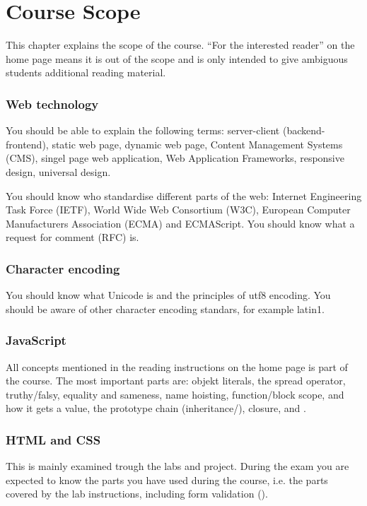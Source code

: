 
\chapter{Course Scope} \label{chapter:course}
This chapter explains the scope of the course. ``For the interested reader'' on the home page means it is out of the scope and is only intended to give ambiguous students additional reading material.

\subsection*{Web technology}
You should be able to explain the following terms: server-client (backend-frontend), static web page, dynamic web page, Content Management Systems (CMS), singel page web application, Web Application Frameworks, responsive design, universal design.

You should know who standardise different parts of the web: Internet Engineering Task Force (IETF), World Wide Web Consortium (W3C), European Computer Manufacturers Association (ECMA) and ECMAScript. You should know what a request for comment (RFC) is.

\subsection*{Character encoding}
You should know what Unicode is and the principles of utf8 encoding. You should be aware of other character encoding standars, for example latin1.

\subsection*{JavaScript}
All concepts mentioned in the reading instructions on the home page is part of the course. The most important parts are: objekt literals, the spread operator, truthy/falsy, equality and sameness, name hoisting, function/block scope,  and how it gets a value, the prototype chain (inheritance/), closure,  and .

\subsection*{HTML and CSS}
This is mainly examined trough the labs and project. During the exam you are expected to know the parts you have used during the course, i.e. the parts covered by the lab instructions, including form validation ().

